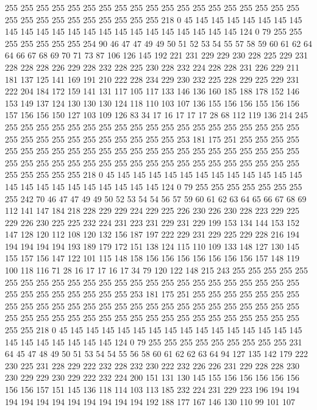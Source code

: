 255 255 255 255 255 255 255 255 255 255 255 255 255 255 255 255 255 255 255 255
255 255 255 255 255 255 255 255 255 218 0 45 145 145 145 145 145 145 145 145
145 145 145 145 145 145 145 145 145 145 145 145 145 145 124 0 79 255 255 255
255 255 255 255 254 90 46 47 47 49 49 50 51 52 53 54 55 57 58 59
60 61 62 64 64 66 67 68 69 70 71 73 87 106 126 145 192 221 231 229
229 230 228 225 229 231 228 228 228 226 229 228 232 228 225 230 228 232 224 228
228 231 226 229 211 181 137 125 141 169 191 210 222 228 234 229 230 232 225 228
229 225 229 231 222 204 184 172 159 141 131 117 105 117 133 146 136 160 185 188
178 152 146 153 149 137 124 130 130 130 124 118 110 103 107 136 155 156 156 155
156 156 157 156 156 150 127 103 109 126 83 34 17 16 17 17 17 28 68 112
119 136 214 245 255 255 255 255 255 255 255 255 255 255 255 255 255 255 255 255
255 255 255 255 255 255 255 255 255 255 255 255 255 255 253 181 175 251 255 255
255 255 255 255 255 255 255 255 255 255 255 255 255 255 255 255 255 255 255 255
255 255 255 255 255 255 255 255 255 255 255 255 255 255 255 255 255 255 255 255
255 255 255 255 255 218 0 45 145 145 145 145 145 145 145 145 145 145 145 145
145 145 145 145 145 145 145 145 145 145 124 0 79 255 255 255 255 255 255 255
255 242 70 46 47 47 49 49 50 52 53 54 54 56 57 59 60 61 62 63
64 65 66 67 68 69 112 141 147 184 218 228 229 229 224 229 225 226 230 226
230 228 223 229 225 229 226 230 225 225 232 224 231 223 231 229 231 229 199 153
134 144 153 152 147 128 120 112 108 120 132 156 187 197 222 229 231 229 225 229
228 216 194 194 194 194 194 193 189 179 172 151 138 124 115 110 109 133 148 127
130 145 155 157 156 147 122 101 115 148 158 156 156 156 156 156 156 156 157 148
119 100 118 116 71 28 16 17 17 16 17 34 79 120 122 148 215 243 255 255
255 255 255 255 255 255 255 255 255 255 255 255 255 255 255 255 255 255 255 255
255 255 255 255 255 255 255 255 255 255 253 181 175 251 255 255 255 255 255 255
255 255 255 255 255 255 255 255 255 255 255 255 255 255 255 255 255 255 255 255
255 255 255 255 255 255 255 255 255 255 255 255 255 255 255 255 255 255 255 255
255 218 0 45 145 145 145 145 145 145 145 145 145 145 145 145 145 145 145 145
145 145 145 145 145 145 124 0 79 255 255 255 255 255 255 255 255 255 231 64
45 47 48 49 50 51 53 54 54 55 56 58 60 61 62 62 63 64 94 127
135 142 179 222 230 225 231 228 229 222 232 228 232 230 222 232 226 226 231 229
228 228 230 230 229 229 230 229 222 232 224 200 151 131 130 145 155 156 156 156
156 156 156 156 157 151 145 136 118 114 103 113 185 232 224 231 229 223 196 194
194 194 194 194 194 194 194 194 194 194 192 188 177 167 146 130 110 99 101 107
